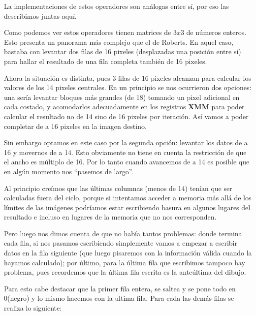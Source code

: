 La implementaciones de estos operadores son análogas entre sí, por eso las 
describimos juntas aquí.

Como podemos ver estos operadores tienen matrices de $3x3$ de números enteros.
Esto presenta un panorama más complejo que el de Roberts. En aquel caso, bastaba
con levantar dos filas de 16 pixeles (desplazadas una posición entre sí) para hallar
el resultado de una fila completa también de 16 pixeles.

Ahora la situación es distinta, pues 3 filas de 16 pixeles alcanzan para calcular
los valores de los 14 pixeles centrales. En un principio se nos ocurrieron dos
opciones: una sería levantar bloques más grandes (de 18) tomando un pixel adicional
en cada costado, y acomodarlos adecuadamente en los registros \textbf{XMM} para
poder calcular el resultado no de 14 sino de 16 pixeles por iteración. Así vamos
a poder completar de a 16 pixeles en la imagen destino.

Sin embargo optamos en este caso por la segunda opción: levantar los datos de a 16
y movernos de a 14. Esto obviamente no tiene en cuenta la restricción de que el 
ancho es múltiplo de 16. Por lo tanto cuando avancemos de a 14 es posible que en algún
momento nos ``pasemos de largo''.

Al principio creímos que las últimas columnas (menos de 14) tenían que ser calculadas
fuera del ciclo, porque si intentamos acceder a memoria más allá de los límites de las
imágenes podríamos estar escribiendo basura en algunos lugares del resultado e incluso
en lugares de la memoria que no nos corresponden.
 
Pero luego nos dimos cuenta de que no había tantos problemas: donde termina cada fila,
si nos pasamos escribiendo simplemente vamos a empezar a escribir datos en la fila
siguiente (que luego pisaremos con la información válida cuando la hayamos calculado);
por último, para la última fila que escribimos tampoco hay problema, pues recordemos
que la última fila escrita es la anteúltima del dibujo.

Para esto cabe destacar que la primer fila entera, se saltea y se pone todo en 0(negro)
y lo mismo hacemos con la ultima fila. Para cada las demás filas se realiza lo siguiente:

